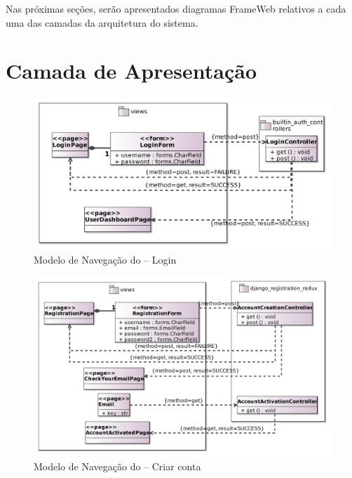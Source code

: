 Nas próximas seções, serão apresentados diagramas FrameWeb relativos a cada uma das camadas da arquitetura do sistema.


\section{Camada de Apresentação}
\label{sec-arquitetura-apresentacao}


\begin{figure}[H]
	\centering
	\includegraphics[scale=0.15]{figuras/FrameWebNavigationModel1.jpg}
	\caption{Modelo de Navegação do \imprimirtitulo{} -- Login}
	\label{fig:nav1}
\end{figure}

\begin{figure}[H]
	\centering
	\includegraphics[scale=0.15]{figuras/FrameWebNavigationModel2.jpg}
	\caption{Modelo de Navegação do \imprimirtitulo{} -- Criar conta}
	\label{fig:nav2}
\end{figure}

